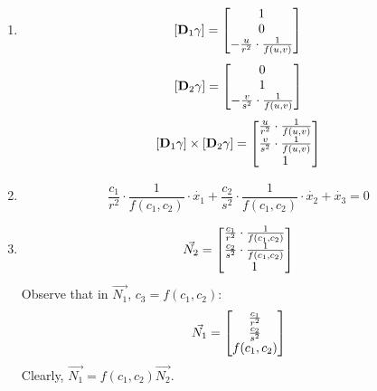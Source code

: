 \documentclass{homework}
\begin{document}
\begin{problem}{3}
\begin{enumerate}
\item
$$[\mathbf{D}_1\gamma] = \begin{bmatrix}1\\0\\
-\frac{u}{r^2}\cdot\frac{1}{f(u, v)}\end{bmatrix}$$
$$[\mathbf{D}_2\gamma] = \begin{bmatrix}0\\1\\
-\frac{v}{s^2}\cdot\frac{1}{f(u, v)}\end{bmatrix}$$
$$[\mathbf{D}_1\gamma] \times [\mathbf{D}_2\gamma] =
\begin{bmatrix}
\frac{u}{r^2}\cdot\frac{1}{f(u, v)}\\
\frac{v}{s^2}\cdot\frac{1}{f(u, v)}\\
1\end{bmatrix}$$

\item
$$\frac{c_1}{r^2}\cdot\frac{1}{f(c_1, c_2)} \cdot \dot{x_1} +
  \frac{c_2}{s^2}\cdot\frac{1}{f(c_1, c_2)} \cdot \dot{x_2} +
  \dot{x_3} = 0$$

\item
$$\vec{N_2} = \begin{bmatrix}
\frac{c_1}{r^2}\cdot\frac{1}{f(c_1, c_2)}\\
\frac{c_2}{s^2}\cdot\frac{1}{f(c_1, c_2)}\\
1\end{bmatrix}$$
Observe that in $\vec{N_1}$, $c_3 = f(c_1, c_2)$:
$$\vec{N_1} = \begin{bmatrix}\frac{c_1}{r^2}\\\frac{c_2}{s^2}\\f(c_1, c_2)\end{bmatrix}$$
Clearly, $\vec{N_1} = f(c_1, c_2)\vec{N_2}$. \QED
\end{enumerate}
\end{problem}
\end{document}
